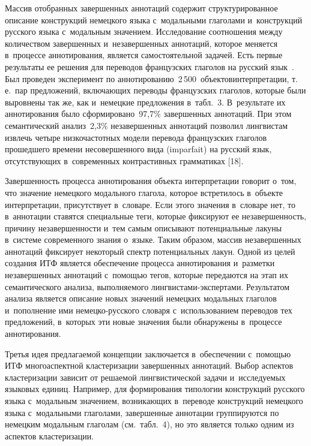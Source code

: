 \begin{multicols}{2}
  
  Массив отобранных завершенных аннотаций содержит структурированное 
описание конструкций немецкого языка с~модальными глаголами 
и~конструкций русского языка с~модальным значением. Исследование 
соотношения между количеством завершенных и~незавершенных аннотаций,\linebreak 
которое меняется в~процессе аннотирования, являет\-ся самостоятельной 
задачей. Есть первые результаты ее решения для переводов французских 
глаголов на русский язык~\cite{17-zat}. Был проведен эксперимент по 
аннотированию~2\,500~объектов\linebreak интерпретации, т.\,е.\ пар предложений, 
вклю\-ча\-ющих переводы французских глаголов, которые были выровнены так 
же, как и~немецкие предложения в~табл.~3. В~результате их аннотирования 
было сформировано~97,7\% завершенных аннотаций. При этом семантический 
анализ~2,3\% незавершенных аннотаций позволил лингвистам извлечь четыре 
низкочастотных модели перевода французских глаголов прошедшего времени 
несовершенного вида (imparfait) на русский язык, отсутствующих 
в~современных контрастивных грамматиках [18].
  
  Завершенность процесса аннотирования объекта интерпретации говорит 
о~том, что значение немецкого модального глагола, которое встретилось 
в~объекте интерпретации, присутствует в~словаре. Если этого значения 
в~словаре нет, то в~аннотации ставятся специальные теги, которые фиксируют 
ее незавершенность, причину незавершенности и~тем самым описывают 
потенциальные лакуны в~сис\-те\-ме современного знания о~языке. Таким образом, 
массив незавершенных аннотаций фиксирует некоторый спектр потенциальных 
лакун. Одной из целей создания ИТФ является обеспечение процесса 
аннотирования и~разметки незавершенных аннотаций с~помощью тегов, 
которые передаются на этап их семантического анализа, выполняемого  
линг\-ви\-ста\-ми-экс\-пер\-та\-ми. Результатом анализа является описание 
новых значений немецких модальных глаголов и~пополнение ими  
не\-мец\-ко-рус\-ско\-го словаря с~использованием переводов тех предложений, в~которых эти новые значения были обнаружены в~процессе аннотирования.
  
  Третья идея предлагаемой концепции заключается в~обеспечении с~помощью 
ИТФ многоаспектной кластеризации завершенных аннотаций. Выбор аспектов 
кластеризации зависит от решаемой лингвистической задачи и~исследуемых 
языковых единиц. Например, для формирования типологии конструкций 
русского языка с~модальным значением, возникающих в~переводе конструкций 
немецкого языка с~модальными глаголами, завершенные аннотации 
группируются по немецким модальным глаголам (см.\ табл.~4), но это является 
только одним из аспектов кластеризации.
  

\end{multicols}
